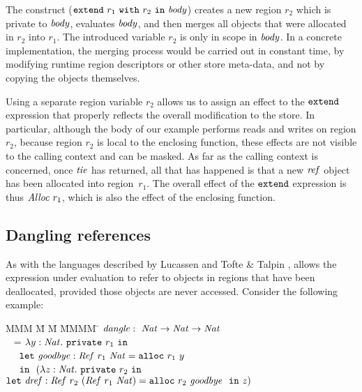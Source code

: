 The construct ($\texttt{extend}~ r_1~ \texttt{with}~ r_2~ \texttt{in}~ \mathit{body}$) creates a new region $r_2$ which is private to $\mathit{body}$, evaluates $\mathit{body}$, and then merges all objects that were allocated in $r_2$ into $r_1$. The introduced variable $r_2$ is only in scope in $\mathit{body}$. In a concrete implementation, the merging process would be carried out in constant time, by modifying runtime region descriptors or other store meta-data, and not by copying the objects themselves.

Using a separate region variable $r_2$ allows us to assign an effect to the $\texttt{extend}$ expression that properly reflects the overall modification to the store. In particular, although the body of our example performs reads and writes on region $r_2$, because region $r_2$ is local to the enclosing function, these effects are not visible to the calling context and can be masked. As far as the calling context is concerned, once $\mathit{tie}$ has returned, all that has happened is that a new $\mathit{ref}$ object has been allocated into region~$r_1$. The overall effect of the $\texttt{extend}$ expression is thus $\mathit{Alloc}~r_1$, which is also the effect of the enclosing function.


\subsection{Dangling references}
\label{s:DanglingReferences}
As with the languages described by Lucassen  and Tofte \& Talpin , \SystemFre allows the expression under evaluation to refer to objects in regions that have been deallocated, provided those objects are never accessed. Consider the following example:

\begin{tabbing}
MMM \= M \= M \= MMMM \= \kill
\> $\mathit{dangle} :~ \mathit{Nat} \to \mathit{Nat} \to \mathit{Nat}$                   
\\ \> \> ~ = $\lambda y : \mathit{Nat}.~ \texttt{private}~ r_1~ \texttt{in}$             
\\ \> \> \> ~~ $\texttt{let}~ \mathit{goodbye} : \mathit{Ref}~ r_1~ \mathit{Nat} 
                = \texttt{alloc}~ r_1~ y$                              
\\ \> \> \> ~~ $\texttt{in}~~ (\lambda z : \mathit{Nat}.~
                \texttt{private}~ r_2~ \texttt{in}$                               
\\ \> \> \> \> $\texttt{let}~ \mathit{dref} : \mathit{Ref}~ r_2~ (\mathit{Ref}~ r_1~ \mathit{Nat})
                = \texttt{alloc}~ r_2~ \mathit{goodbye}~~ \texttt{in}~  z)$             
\end{tabbing}

